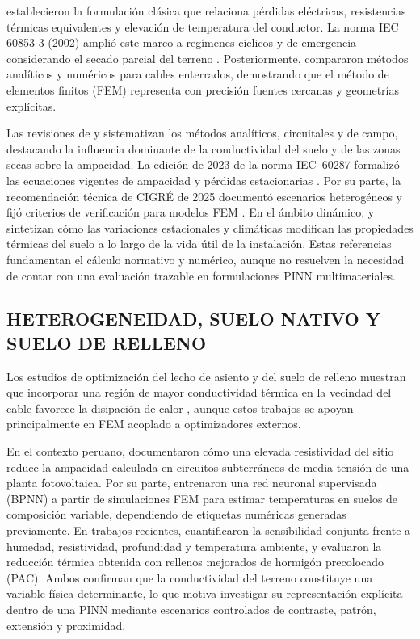 \textcite[752--772]{neher1957} establecieron la formulación clásica que relaciona pérdidas eléctricas, resistencias térmicas equivalentes y elevación de temperatura del conductor. La norma IEC 60853-3 (2002) amplió este marco a regímenes cíclicos y de emergencia considerando el secado parcial del terreno \parencite[cláusulas~2--4]{iec60853}. Posteriormente, \textcite[1387--1400]{aras2005} compararon métodos analíticos y numéricos para cables enterrados, demostrando que el método de elementos finitos (FEM) representa con precisión fuentes cercanas y geometrías explícitas.

Las revisiones de \textcite[4,11,17]{enescu2020} y \textcite[3--6]{enescu2021} sistematizan los métodos analíticos, circuitales y de campo, destacando la influencia dominante de la conductividad del suelo y de las zonas secas sobre la ampacidad. La edición de 2023 de la norma IEC~60287 formalizó las ecuaciones vigentes de ampacidad y pérdidas estacionarias \parencite[cláusulas~4--5]{iec60287}. Por su parte, la recomendación técnica de CIGRÉ de 2025 documentó escenarios heterogéneos y fijó criterios de verificación para modelos FEM \parencite[3--4,41--42,93--99]{cigre2025}. En el ámbito dinámico, \textcite{mobius2025} y \textcite{fariz2026} sintetizan cómo las variaciones estacionales y climáticas modifican las propiedades térmicas del suelo a lo largo de la vida útil de la instalación. Estas referencias fundamentan el cálculo normativo y numérico, aunque no resuelven la necesidad de contar con una evaluación trazable en formulaciones PINN multimateriales.

\subsection{HETEROGENEIDAD, SUELO NATIVO Y SUELO DE RELLENO}

Los estudios de optimización del lecho de asiento y del suelo de relleno muestran que incorporar una región de mayor conductividad térmica en la vecindad del cable favorece la disipación de calor \parencites[1--3]{oclon2015}[1--4]{atoccsa2024}, aunque estos trabajos se apoyan principalmente en FEM acoplado a optimizadores externos.

En el contexto peruano, \textcite[7--8]{ariasVelasquez2023} documentaron cómo una elevada resistividad del sitio reduce la ampacidad calculada en circuitos subterráneos de media tensión de una planta fotovoltaica. Por su parte, \textcite[1--3,12]{aldulaimi2024} entrenaron una red neuronal supervisada (BPNN) a partir de simulaciones FEM para estimar temperaturas en suelos de composición variable, dependiendo de etiquetas numéricas generadas previamente. En trabajos recientes, \textcite[1,6--9]{khumalo2025} cuantificaron la sensibilidad conjunta frente a humedad, resistividad, profundidad y temperatura ambiente, y \textcite[1,10,16]{kim2025} evaluaron la reducción térmica obtenida con rellenos mejorados de hormigón precolocado (PAC). Ambos confirman que la conductividad del terreno constituye una variable física determinante, lo que motiva investigar su representación explícita dentro de una PINN mediante escenarios controlados de contraste, patrón, extensión y proximidad.

